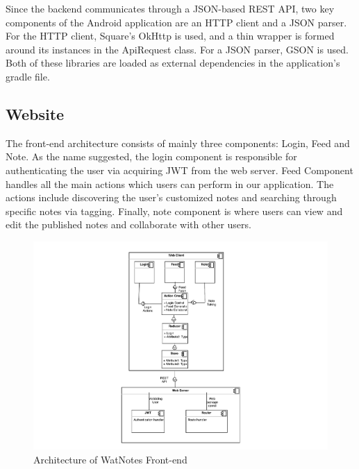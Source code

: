 \documentclass[12pt]{article}
\begin{document}
    Since the backend communicates through a JSON-based REST API, two key components of the
    Android application are an HTTP client and a JSON parser. For the HTTP client, Square's
    OkHttp is used, and a thin wrapper is formed around its instances in the ApiRequest class.
    For a JSON parser, GSON is used. Both of these libraries are loaded as external dependencies
    in the application's gradle file. \\

  \subsection{Website}

  The front-end architecture consists of mainly three components: Login, Feed and Note. As the name suggested, the login component is responsible for authenticating the user via acquiring JWT from the web server. Feed Component handles all the main actions which users can perform in our application. The actions include discovering the user's customized notes and searching through specific notes via tagging. Finally, note component is where users can view and edit the published notes and collaborate with other users. \\

  \begin{figure}[H]
    \includegraphics[width=\textwidth]{assets/frontend_architecture.pdf}
    \caption{Architecture of WatNotes Front-end}
  \end{figure}
\end{document}
